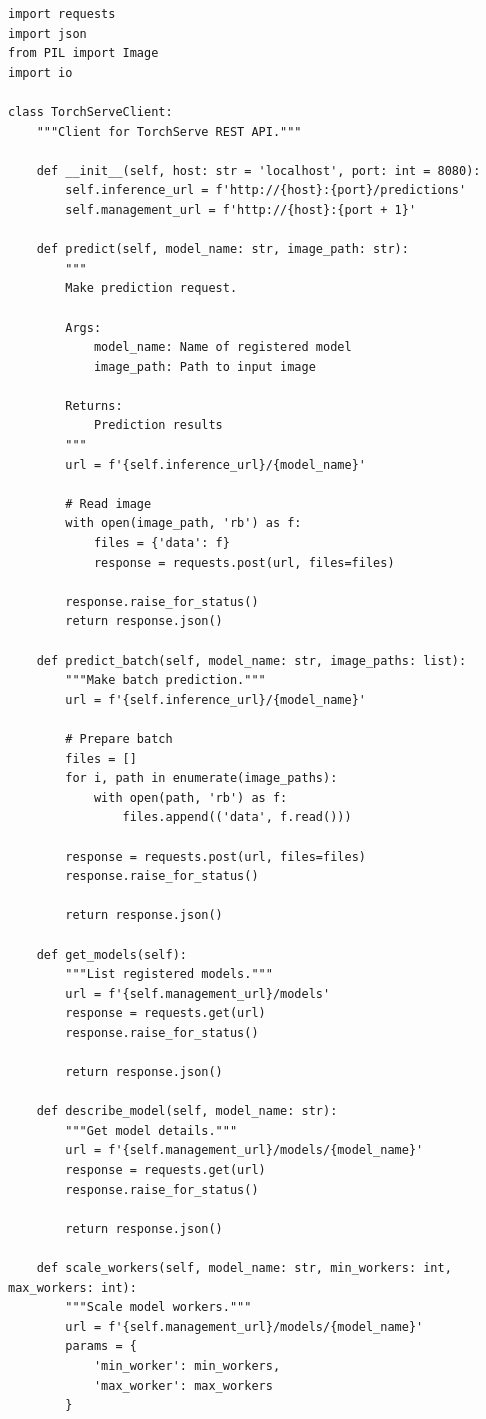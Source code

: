 \begin{lstlisting}[style=python, caption=TorchServe client]
import requests
import json
from PIL import Image
import io

class TorchServeClient:
    """Client for TorchServe REST API."""

    def __init__(self, host: str = 'localhost', port: int = 8080):
        self.inference_url = f'http://{host}:{port}/predictions'
        self.management_url = f'http://{host}:{port + 1}'

    def predict(self, model_name: str, image_path: str):
        """
        Make prediction request.

        Args:
            model_name: Name of registered model
            image_path: Path to input image

        Returns:
            Prediction results
        """
        url = f'{self.inference_url}/{model_name}'

        # Read image
        with open(image_path, 'rb') as f:
            files = {'data': f}
            response = requests.post(url, files=files)

        response.raise_for_status()
        return response.json()

    def predict_batch(self, model_name: str, image_paths: list):
        """Make batch prediction."""
        url = f'{self.inference_url}/{model_name}'

        # Prepare batch
        files = []
        for i, path in enumerate(image_paths):
            with open(path, 'rb') as f:
                files.append(('data', f.read()))

        response = requests.post(url, files=files)
        response.raise_for_status()

        return response.json()

    def get_models(self):
        """List registered models."""
        url = f'{self.management_url}/models'
        response = requests.get(url)
        response.raise_for_status()

        return response.json()

    def describe_model(self, model_name: str):
        """Get model details."""
        url = f'{self.management_url}/models/{model_name}'
        response = requests.get(url)
        response.raise_for_status()

        return response.json()

    def scale_workers(self, model_name: str, min_workers: int, max_workers: int):
        """Scale model workers."""
        url = f'{self.management_url}/models/{model_name}'
        params = {
            'min_worker': min_workers,
            'max_worker': max_workers
        }


\end{lstlisting}
